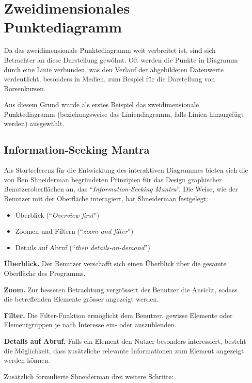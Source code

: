 \section{Zweidimensionales Punktediagramm}

Da das zweidimensionale Punktediagramm weit verbreitet ist, sind sich Betrachter an diese Darstellung gewöhnt. Oft werden die Punkte in Diagramm durch eine Linie verbunden, was den Verlauf der abgebildeten Datenwerte verdeutlicht, besonders in Medien, zum Bespiel für die Darstellung von Börsenkursen. 

Aus diesem Grund wurde als erstes Beispiel das zweidimensionale Punktediagramm (beziehungsweise das Liniendiagramm, falls Linien hinzugefügt werden) ausgewählt.

\subsection{Information-Seeking Mantra}

Als Startreferenz für die Entwicklung des interaktiven Diagrammes bieten sich die von Ben Shneiderman begründeten Prinzipien für das Design graphischer Benutzeroberflächen an, das "`\textit{Information-Seeking Mantra}"'. Die Weise, wie der Benutzer mit der Oberfläche interagiert, hat Shneiderman \cite{shneiderman} festgelegt:

\begin{itemize}
	\item Überblick ("`\textit{Overview first}"')
	\item Zoomen und Filtern ("`\textit{zoom and filter}"')
	\item Details auf Abruf ("`\textit{then details-on-demand}"')
\end{itemize}

\textbf{Überblick.} Der Benutzer verschafft sich einen Überblick über die gesamte Oberfläche des Programms.

\textbf{Zoom.} Zur besseren Betrachtung vergrössert der Benutzer die Ansicht, sodass die betreffenden Elemente grösser angezeigt werden.

\textbf{Filter.} Die Filter-Funktion ermöglicht dem Benutzer, gewisse Elemente oder Elementgruppen je nach Interesse ein- oder auszublenden.

\textbf{Details auf Abruf.} Falls ein Element den Nutzer besonders interessiert, besteht die Möglichkeit, dass zusätzliche relevante Informationen zum Element angezeigt werden können.

Zusätzlich formulierte Shneiderman drei weitere Schritte:

